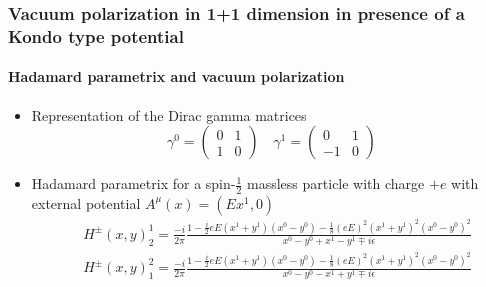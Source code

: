 \documentclass[french]{beamer}
\begin{document}
\begin{frame}[shrink=20]
\frametitle{Vacuum polarization in 1+1 dimension in presence of a Kondo type potential}
\framesubtitle{Hadamard parametrix and vacuum polarization}

\begin{itemize}
\item Representation of the Dirac gamma matrices
\begin{equation*}
\gamma^0 = \begin{pmatrix}
0 & 1 \\
1 & 0 \end{pmatrix}  \quad  \gamma^1 = \begin{pmatrix}
0  & 1 \\
-1 & 0
\end{pmatrix}
\end{equation*}

\item Hadamard parametrix for a spin-$\frac 1 2$ massless particle with charge $+e$ with external potential $A^\mu(x) = (Ex^1, 0 )$
\begin{equation*}
\begin{split}
& H^\pm (x, y)^1_2 = \frac{-i}{2\pi}\frac{1-\frac i 2 e E(x^1 + y^1)(x^0-y^0) 
- \frac 1 8 (eE)^2(x^1 + y^1)^2(x^0 - y^0)^2}{x^0 - y^0 + x^1 - y^1 \mp i \epsilon}  \\
& H^\pm (x, y)^2_1 = \frac{-i}{2\pi}\frac{1-\frac i 2 e E(x^1 + y^1)(x^0-y^0) 
- \frac 1 8 (eE)^2(x^1 + y^1)^2(x^0 - y^0)^2}{x^0 - y^0 - x^1 + y^1 \mp i \epsilon}
\end{split}
\end{equation*}

\end{itemize}

\end{frame}
\end{document}
